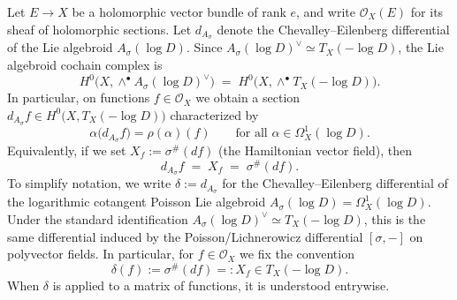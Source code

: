 \documentclass[11pt]{amsart}
\theoremstyle{plain}
\theoremstyle{definition}
\theoremstyle{definition}
\newcommand{\OO}{\mathcal{O}}
\begin{document}
Let $E\to X$ be a holomorphic vector bundle of rank $e$, and write $\OO_X(E)$ for its sheaf of holomorphic sections.
Let $d_{A_\sigma}$ denote the Chevalley--Eilenberg differential of the Lie algebroid $A_\sigma(\log D)$.
Since $A_\sigma(\log D)^\vee\simeq T_X(-\log D)$, the Lie algebroid cochain complex is
$$
 H^0\big(X,\wedge^\bullet A_\sigma(\log D)^\vee\big)
\;=\;
 H^0\big(X,\wedge^\bullet T_X(-\log D)\big).
$$
In particular, on functions $f\in\OO_X$ we obtain a section $d_{A_\sigma}f\in H^0\big(X,T_X(-\log D)\big)$
characterized by
$$
\alpha\big(d_{A_\sigma}f\big)=\rho(\alpha)(f)
\qquad\text{for all }\alpha\in\Omega_X^1(\log D).
$$
Equivalently, if we set $X_f:=\sigma^\#(df)$ (the Hamiltonian vector field), then
\begin{equation}\label{eq:dA-on-f}
d_{A_\sigma}f \;=\; X_f \;=\; \sigma^\#(df).
\end{equation}
To simplify notation, we write $\delta:=d_{A_\sigma}$ for the Chevalley--Eilenberg differential of the logarithmic cotangent Poisson Lie algebroid
$A_\sigma(\log D)=\Omega_X^1(\log D)$. Under the standard identification
$A_\sigma(\log D)^\vee\simeq T_X(-\log D)$, this is the same differential induced by the Poisson/Lichnerowicz differential $[\sigma,-]$ on polyvector fields.
In particular, for $f\in\OO_X$ we fix the convention
\begin{equation}\label{eq:delta-conv}
\delta(f):=\sigma^\#(df)=:X_f\in T_X(-\log D).
\end{equation}
When $\delta$ is applied to a matrix of functions, it is understood entrywise.
\end{document}

